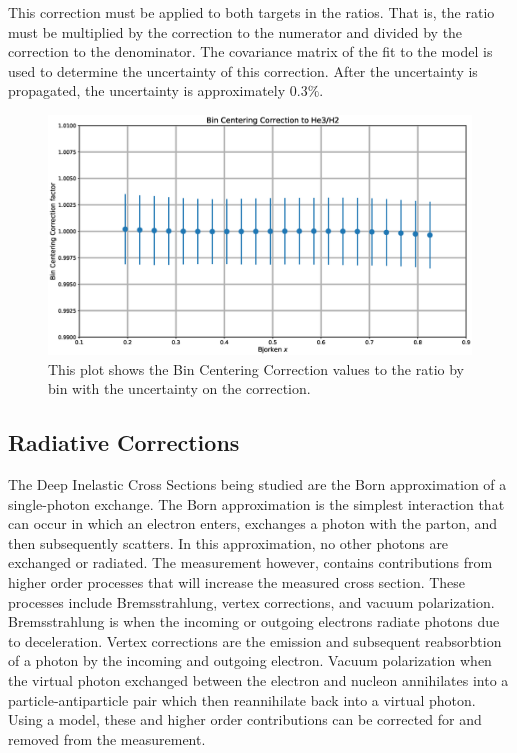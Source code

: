 This correction must be applied to both targets in the ratios. That is, the ratio must be multiplied by the correction to the numerator and divided by the correction to the denominator.\cite{wtsydp} The covariance matrix of the fit to the model is used to determine the uncertainty of this correction. After the uncertainty is propagated, the uncertainty is approximately $0.3\%$.

\begin{figure}
	\includegraphics[width=\textwidth]{./analysis/fig/bcc.eps}
	\caption{This plot shows the Bin Centering Correction values to the  ratio by bin with the uncertainty on the correction.}
\end{figure}

\subsection{Radiative Corrections}

The Deep Inelastic Cross Sections being studied are the Born approximation of a single-photon exchange. The Born approximation is the simplest interaction that can occur in which an electron enters, exchanges a photon with the parton, and then subsequently scatters. In this approximation, no other photons are exchanged or radiated. The measurement however, contains contributions from higher order processes that will increase the measured cross section. These processes include Bremsstrahlung, vertex corrections, and vacuum polarization. Bremsstrahlung is when the incoming or outgoing electrons radiate photons due to deceleration. Vertex corrections are the emission and subsequent reabsorbtion of a photon by the incoming and outgoing electron. Vacuum polarization when the virtual photon exchanged between the electron and nucleon annihilates into a particle-antiparticle pair which then reannihilate back into a virtual photon. Using a model, these and higher order contributions can be corrected for and removed from the measurement.

